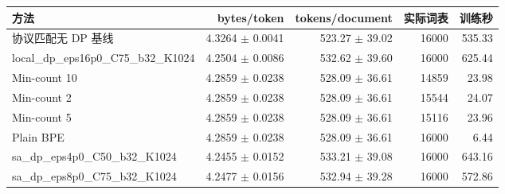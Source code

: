 \begin{tabular}{lrrrr}
\toprule
方法 & bytes/token & tokens/document & 实际词表 & 训练秒 \\
\midrule
协议匹配无 DP 基线 & 4.3264 $\pm$ 0.0041 & 523.27 $\pm$ 39.02 & 16000 & 535.33 \\
local\_dp\_eps16p0\_C75\_b32\_K1024 & 4.2504 $\pm$ 0.0086 & 532.62 $\pm$ 39.60 & 16000 & 625.44 \\
Min-count 10 & 4.2859 $\pm$ 0.0238 & 528.09 $\pm$ 36.61 & 14859 & 23.98 \\
Min-count 2 & 4.2859 $\pm$ 0.0238 & 528.09 $\pm$ 36.61 & 15544 & 24.07 \\
Min-count 5 & 4.2859 $\pm$ 0.0238 & 528.09 $\pm$ 36.61 & 15116 & 23.96 \\
Plain BPE & 4.2859 $\pm$ 0.0238 & 528.09 $\pm$ 36.61 & 16000 & 6.44 \\
sa\_dp\_eps4p0\_C50\_b32\_K1024 & 4.2455 $\pm$ 0.0152 & 533.21 $\pm$ 39.08 & 16000 & 643.16 \\
sa\_dp\_eps8p0\_C75\_b32\_K1024 & 4.2477 $\pm$ 0.0156 & 532.94 $\pm$ 39.28 & 16000 & 572.86 \\
\bottomrule
\end{tabular}
